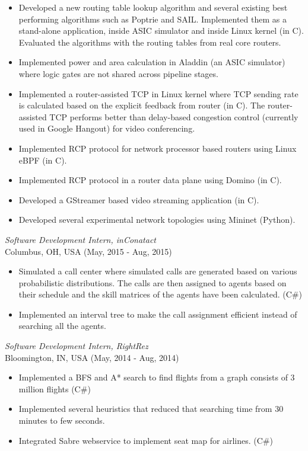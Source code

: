 \documentclass{res}
\begin{document}
\begin{resume}
   \begin{itemize} \itemsep -2pt %
  \item Developed a new routing table lookup algorithm and several existing best performing algorithms such as Poptrie and SAIL. Implemented them as a stand-alone application, inside ASIC simulator and inside Linux kernel (in C). Evaluated the algorithms with the routing tables from real core routers.
  \item Implemented power and area calculation in Aladdin (an ASIC simulator) where logic gates are not shared across pipeline stages.
  \item Implemented a router-assisted TCP in Linux kernel where TCP sending rate is calculated based on the explicit feedback from router (in C). The router-assisted TCP performs better than delay-based congestion control (currently used in Google Hangout) for video conferencing.  
  \item Implemented RCP protocol for network processor based routers using Linux eBPF (in C). 
  \item Implemented RCP protocol in a router data plane using Domino (in C).
  \item Developed a GStreamer based video streaming application (in C).
  \item Developed several experimental network topologies using Mininet (Python).	
 \end{itemize}

{\sl Software Development Intern, inConatact} \\
Columbus, OH, USA (May, 2015 - Aug, 2015)
 \begin{itemize} \itemsep -2pt
	\item  Simulated a call center where simulated calls are generated based on various probabilistic distributions. The calls are then assigned to
	agents based on their schedule and the skill matrices of the agents have been calculated. (C\#)
	\item  Implemented an interval tree to make the call assignment efficient instead of searching all the agents.
  \end{itemize} \vspace{-6pt}

{\sl Software Development Intern, RightRez} \\
Bloomington, IN, USA (May, 2014 - Aug, 2014)
\begin{itemize} \itemsep -2pt
	\item  Implemented a BFS and A* search to find flights from a graph consists of 3 million flights (C\#)
	\item  Implemented several heuristics that reduced that searching time from 30 minutes to few seconds.
    \item  Integrated Sabre webservice to implement seat map for airlines. (C\#)
\end{itemize} \vspace{-6pt}


\end{resume}
\end{document}
